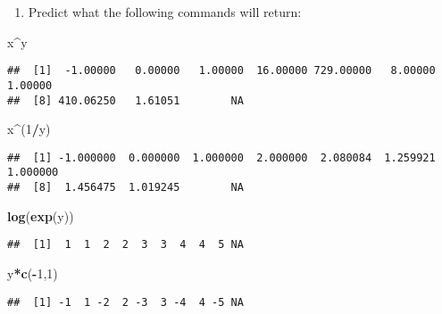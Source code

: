 \documentclass[]{article}
\newenvironment{Shaded}{\begin{snugshade}}{\end{snugshade}}
\newcommand{\KeywordTok}[1]{\textcolor[rgb]{0.13,0.29,0.53}{\textbf{#1}}}
\newcommand{\DecValTok}[1]{\textcolor[rgb]{0.00,0.00,0.81}{#1}}
\newcommand{\OperatorTok}[1]{\textcolor[rgb]{0.81,0.36,0.00}{\textbf{#1}}}
\newcommand{\NormalTok}[1]{#1}
\providecommand{\tightlist}{%
  \setlength{\itemsep}{0pt}\setlength{\parskip}{0pt}}
\begin{document}
\begin{enumerate}
\def\labelenumi{\arabic{enumi}.}
\setcounter{enumi}{6}
\tightlist
\item
  Predict what the following commands will return:
\end{enumerate}

\begin{Shaded}
\begin{Highlighting}[]
\NormalTok{x}\OperatorTok{^}\NormalTok{y}
\end{Highlighting}
\end{Shaded}

\begin{verbatim}
##  [1]  -1.00000   0.00000   1.00000  16.00000 729.00000   8.00000   1.00000
##  [8] 410.06250   1.61051        NA
\end{verbatim}

\begin{Shaded}
\begin{Highlighting}[]
\NormalTok{x}\OperatorTok{^}\NormalTok{(}\DecValTok{1}\OperatorTok{/}\NormalTok{y)}
\end{Highlighting}
\end{Shaded}

\begin{verbatim}
##  [1] -1.000000  0.000000  1.000000  2.000000  2.080084  1.259921  1.000000
##  [8]  1.456475  1.019245        NA
\end{verbatim}

\begin{Shaded}
\begin{Highlighting}[]
\KeywordTok{log}\NormalTok{(}\KeywordTok{exp}\NormalTok{(y))}
\end{Highlighting}
\end{Shaded}

\begin{verbatim}
##  [1]  1  1  2  2  3  3  4  4  5 NA
\end{verbatim}

\begin{Shaded}
\begin{Highlighting}[]
\NormalTok{y}\OperatorTok{*}\KeywordTok{c}\NormalTok{(}\OperatorTok{-}\DecValTok{1}\NormalTok{,}\DecValTok{1}\NormalTok{)}
\end{Highlighting}
\end{Shaded}

\begin{verbatim}
##  [1] -1  1 -2  2 -3  3 -4  4 -5 NA
\end{verbatim}
\end{document}
